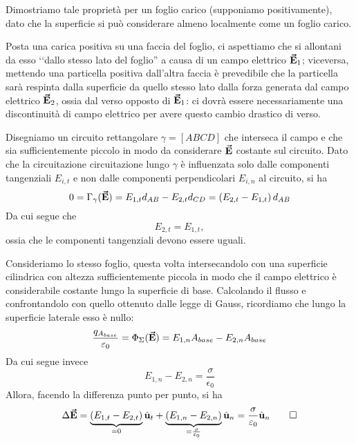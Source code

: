 \begin{demonstration}
	Dimostriamo tale proprietà per un foglio carico (supponiamo positivamente), dato che la superficie si può considerare almeno localmente come un foglio 
	carico.
	
	Posta una carica positiva su una faccia del foglio, ci aspettiamo che si allontani da esso ‘‘dallo stesso lato del foglio'' a causa di un campo elettrico $\vb*{\va{E}}_1$; viceversa, mettendo una particella positiva dall'altra faccia è prevedibile che la particella sarà respinta dalla superficie da quello stesso lato dalla forza generata dal campo elettrico $\vb*{\va{E}}_2$, ossia dal verso opposto di $\vb*{\va{E}}_1$: ci dovrà essere necessariamente una discontinuità di campo elettrico per avere questo cambio drastico di verso.
	
	Disegniamo un circuito rettangolare $\gamma=[ABCD]$ che interseca il campo e che sia sufficientemente piccolo in modo da considerare $\vb*{\va{E}}$ costante sul circuito. Dato che la circuitazione circuitazione lungo $\gamma$ è influenzata solo dalle componenti tangenziali $E_{i,t}$ e non dalle componenti perpendicolari $E_{i,n}$ al circuito, si ha
	\begin{equation*}
		0=\Gamma_{\gamma}(\vb*{\va{E}})=E_{1,t}d_{AB}-E_{2,t}d_{CD}=\left(E_{2,t}-E_{1,t}\right)d_{AB}
	\end{equation*}
Da cui segue che
\begin{equation*}
	E_{2,t}=E_{1,t},
\end{equation*}
ossia che le componenti tangenziali devono essere uguali.

Consideriamo lo stesso foglio, questa volta intersecandolo con una superficie cilindrica con altezza sufficientemente piccola in modo che  il campo elettrico è considerabile costante lungo la superficie di base. Calcolando il flusso e confrontandolo con quello ottenuto dalle legge di Gauss, ricordiamo che lungo la superficie laterale esso è nullo:
\begin{equation*}
	\frac{q_{A_{base}}}{\varepsilon_0}=\Phi_{\Sigma}(\vb*{\va{E}})=E_{1,n}A_{base}-E_{2,n}A_{base}
\end{equation*}
Da cui segue invece
\begin{equation*}
	E_{1,n}-E_{2,n}=\frac{\sigma}{\epsilon_0}
\end{equation*}
Allora, facendo la differenza punto per punto, si ha
\begin{equation*}
	\Delta\vb*{\va{E}}=\underbrace{\left(E_{1,t}-E_{2,t}\right)}_{=0}\hat{\mathbf{u}}_t+\underbrace{\left(E_{1,n}-E_{2,n}\right)}_{=\frac{\sigma}{\varepsilon_0}}\hat{\mathbf{u}}_n=\frac{\sigma}{\varepsilon_0}\hat{\mathbf{u}}_n\qedhere
\end{equation*}
\end{demonstration}
